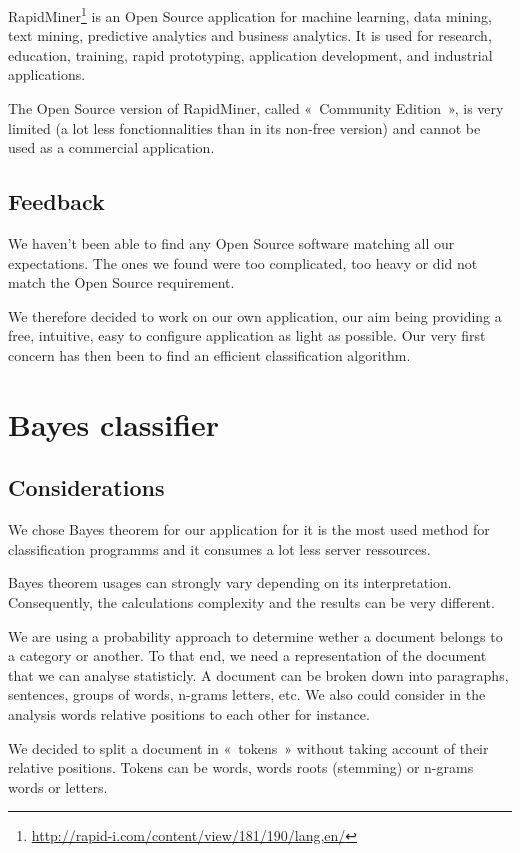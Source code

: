 \documentclass[a4paper,11pt]{article}
\begin{document}
RapidMiner\footnote{\url{http://rapid-i.com/content/view/181/190/lang,en/}} is
an Open Source application for machine learning, data mining, text
mining, predictive analytics and business analytics.
It is used for research, education, training, rapid prototyping, application
development, and industrial applications.

The Open Source version of RapidMiner, called «~Community Edition~», is very
limited (a lot less fonctionnalities than in its non-free version) and cannot
be used as a commercial application.

\subsection{Feedback}

We haven't been able to find any Open Source software matching all our
expectations. The ones we found were too complicated, too heavy or did not
match the Open Source requirement.

We therefore decided to work on our own application, our aim being providing
a free, intuitive, easy to configure application as light as possible. Our
very first concern has then been to find an efficient classification
algorithm.


\section{Bayes classifier}

\subsection{Considerations}

We chose Bayes theorem for our application for it is the most used method for
classification programms and it consumes a lot less server ressources.

Bayes theorem usages can strongly vary depending on its interpretation.
Consequently, the calculations complexity and the results can be very
different.

We are using a probability approach to determine wether a document belongs to
a category or another. To that end, we need a representation of the document
that we can analyse statisticly. A document can be broken down into
paragraphs, sentences, groups of words, n-grams letters, etc. We also could
consider in the analysis words relative positions to each other for instance.

We decided to split a document in «~tokens~» without taking account of their
relative positions. Tokens can be words, words roots (stemming) or n-grams
words or letters.
\end{document}
